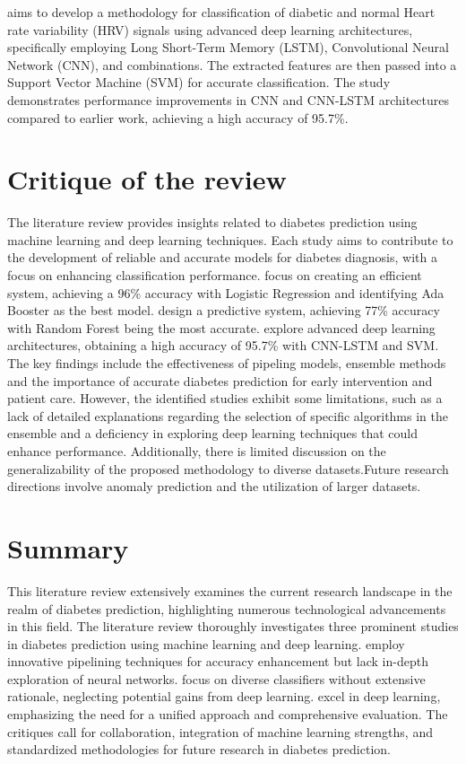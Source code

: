 \cite{swapna2018diabetes} aims to develop a methodology for classification of diabetic and normal Heart rate variability (HRV) signals using advanced deep learning architectures, specifically employing Long Short-Term Memory (LSTM), Convolutional Neural Network (CNN), and combinations. The extracted features are then passed into a Support Vector Machine (SVM) for accurate classification. The study demonstrates performance improvements in CNN and CNN-LSTM architectures compared to earlier work, achieving a high accuracy of 95.7\%. 

\section{Critique of the review} %
The literature review provides insights related to diabetes prediction using machine learning and deep learning techniques. Each study aims to contribute to the development of reliable and accurate models for diabetes diagnosis, with a focus on enhancing classification performance. \cite{mujumdar2019diabetes} focus on creating an efficient system, achieving a 96\% accuracy with Logistic Regression and identifying Ada Booster as the best model. \cite{soni2020diabetes} design a predictive system, achieving 77\% accuracy with Random Forest being the most accurate. \cite{swapna2018diabetes} explore advanced deep learning architectures, obtaining a high accuracy of 95.7\% with CNN-LSTM and SVM. The key findings include the effectiveness of pipeling models, ensemble methods and the importance of accurate diabetes prediction for early intervention and patient care. However, the identified studies exhibit some limitations, such as a lack of detailed explanations regarding the selection of specific algorithms in the ensemble and a deficiency in exploring deep learning techniques that could enhance performance. Additionally, there is limited discussion on the generalizability of the proposed methodology to diverse datasets.Future research directions involve anomaly prediction and the utilization of larger datasets.
~\\

\section{Summary} 
This literature review extensively examines the current research landscape in the realm of diabetes prediction, highlighting numerous technological advancements in this field. The literature review thoroughly investigates three prominent studies in diabetes prediction using machine learning and deep learning. \cite{mujumdar2019diabetes} employ innovative pipelining techniques for accuracy enhancement but lack in-depth exploration of neural networks. \cite{soni2020diabetes} focus on diverse classifiers without extensive rationale, neglecting potential gains from deep learning. \cite{swapna2018diabetes} excel in deep learning, emphasizing the need for a unified approach and comprehensive evaluation. The critiques call for collaboration, integration of machine learning strengths, and standardized methodologies for future research in diabetes prediction.
~\\
